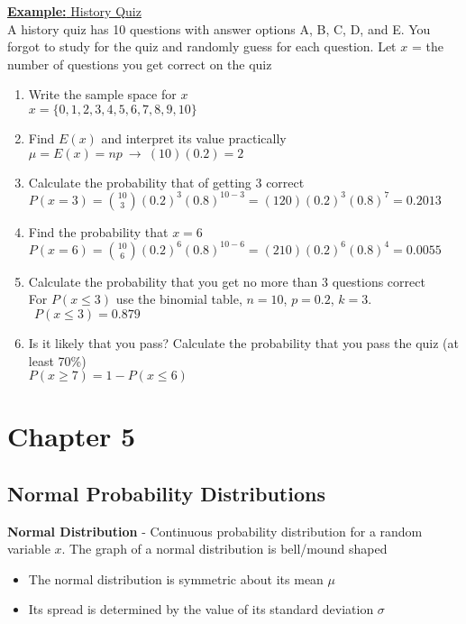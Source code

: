 \documentclass[a4paper]{article}
\let\bf\textbf
\begin{document}
\begin{shaded}
    \underline{\bf{Example:} History Quiz}
    \vspace{2mm}\\
    A history quiz has 10 questions with answer options A, B, C, D, and E. You forgot to study for the quiz and randomly guess for each question. Let $x$ = the number of questions you get correct on the quiz
    \begin{enumerate}
        \item Write the sample space for $x$\\
        $x = \{0, 1, 2, 3, 4, 5, 6, 7, 8, 9, 10\}$
        \item Find $E(x)$ and interpret its value practically\\
        $\mu = E(x) = np\ \to \ (10)(0.2) = 2$
        \item Calculate the probability that of getting 3 correct\\
        $P(x = 3) = \binom{10}{3}(0.2)^3(0.8)^{10 - 3} = (120)(0.2)^3(0.8)^7 = 0.2013$
        \item Find the probability that $x = 6$\\
        $P(x = 6) = \binom{10}{6}(0.2)^6(0.8)^{10 - 6} = (210)(0.2)^6(0.8)^4 = 0.0055$
        \item Calculate the probability that you get no more than 3 questions correct\\
        For $P(x \leq 3)$ use the binomial table, $n = 10$, $p = 0.2$, $k = 3$. $\ \ P(x \leq 3) = 0.879$
        \item Is it likely that you pass? Calculate the probability that you pass the quiz (at least 70\%)\\
        $P(x \geq 7) = 1 - P(x \leq 6)$
    \end{enumerate}
\end{shaded}

\newpage

\section{Chapter 5}
\subsection{Normal Probability Distributions}
\bf{Normal Distribution} - Continuous probability distribution for a random variable $x$. The graph of a normal distribution is bell/mound shaped
\begin{itemize}
    \item The normal distribution is symmetric about its mean $\mu$
    \item Its spread is determined by the value of its standard deviation $\sigma$
\end{itemize}
\end{document}
